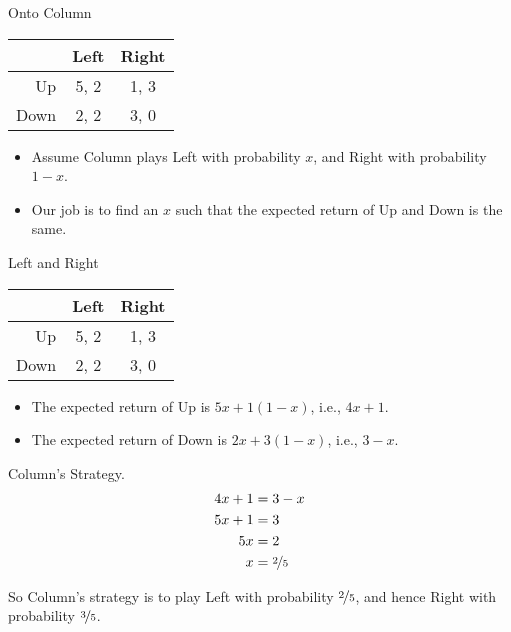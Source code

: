 \documentclass[
  ignorenonframetext,
]{beamer}
\providecommand{\tightlist}{%
  \setlength{\itemsep}{0pt}\setlength{\parskip}{0pt}}
\begin{document}
\begin{frame}{Onto Column}
\protect\hypertarget{onto-column}{}
\begin{table}[!h]
\centering
\begin{tabular}[t]{>{}r|cc}
\toprule
 & Left & Right\\
\midrule
Up & 5, 2 & 1, 3\\
Down & 2, 2 & 3, 0\\
\bottomrule
\end{tabular}
\end{table}

\begin{itemize}
\tightlist
\item
  Assume Column plays Left with probability \(x\), and Right with
  probability \(1-x\).
\item
  Our job is to find an \(x\) such that the expected return of Up and
  Down is the same.
\end{itemize}
\end{frame}

\begin{frame}{Left and Right}
\protect\hypertarget{left-and-right-1}{}
\begin{table}[!h]
\centering
\begin{tabular}[t]{>{}r|cc}
\toprule
 & Left & Right\\
\midrule
Up & 5, 2 & 1, 3\\
Down & 2, 2 & 3, 0\\
\bottomrule
\end{tabular}
\end{table}

\begin{itemize}
\tightlist
\item
  The expected return of Up is \(5x + 1(1-x)\), i.e., \(4x + 1\).
\item
  The expected return of Down is \(2x + 3(1-x)\), i.e., \(3 - x\).
\end{itemize}
\end{frame}

\begin{frame}{Column's Strategy.}
\protect\hypertarget{columns-strategy.}{}
\begin{align*}
4x + 1 &= 3 - x \\
5x + 1 &= 3 \\
5x    &= 2 \\
x    &= \nicefrac{2}{5}
\end{align*}

So Column's strategy is to play Left with probability
\(\nicefrac{2}{5}\), and hence Right with probability
\(\nicefrac{3}{5}\).
\end{frame}
\end{document}
